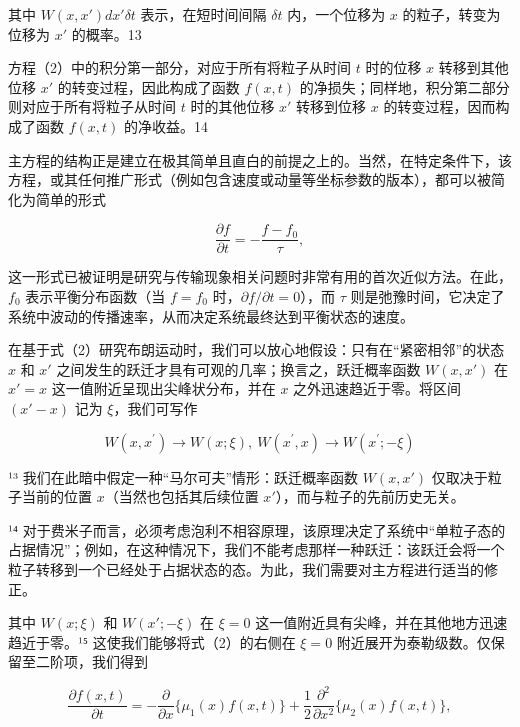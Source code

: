 其中 \(W(x,x')dx'\delta t\) 表示，在短时间间隔 \(\delta t\) 内，一个位移为 \(x\) 的粒子，转变为位移为 \(x'\) 的概率。13

方程（2）中的积分第一部分，对应于所有将粒子从时间 \(t\) 时的位移 \(x\) 转移到其他位移 \(x'\) 的转变过程，因此构成了函数 \(f(x,t)\) 的净损失；同样地，积分第二部分则对应于所有将粒子从时间 \(t\) 时的其他位移 \(x'\) 转移到位移 \(x\) 的转变过程，因而构成了函数 \(f(x,t)\) 的净收益。14

主方程的结构正是建立在极其简单且直白的前提之上的。当然，在特定条件下，该方程，或其任何推广形式（例如包含速度或动量等坐标参数的版本），都可以被简化为简单的形式

\begin{equation}\tag{15.4.3}\label{eq:15.4.3}
\frac { \partial f } { \partial t } = - \frac { f - f _ { 0 } } { \tau } ,
\end{equation}

这一形式已被证明是研究与传输现象相关问题时非常有用的首次近似方法。在此，\(f_0\) 表示平衡分布函数（当 \(f=f_0\) 时，\(\partial f/\partial t=0\)），而 \(\tau\) 则是弛豫时间，它决定了系统中波动的传播速率，从而决定系统最终达到平衡状态的速度。

在基于式（2）研究布朗运动时，我们可以放心地假设：只有在``紧密相邻''的状态 \(x\) 和 \(x'\) 之间发生的跃迁才具有可观的几率；换言之，跃迁概率函数 \(W(x, x')\) 在 \(x' = x\) 这一值附近呈现出尖峰状分布，并在 \(x\) 之外迅速趋近于零。将区间 \((x' - x)\) 记为 \(\xi\)，我们可写作

\begin{equation}\tag{15.4.4}\label{eq:15.4.4}
W ( x , x ^{\prime} ) \rightarrow W ( x ; \xi ) , \ W ( x ^{\prime} , x ) \rightarrow W ( x ^{\prime} ; - \xi )
\end{equation}

¹³ 我们在此暗中假定一种``马尔可夫''情形：跃迁概率函数 \(W(x, x')\) 仅取决于粒子当前的位置 \(x\)（当然也包括其后续位置 \(x'\)），而与粒子的先前历史无关。

¹⁴ 对于费米子而言，必须考虑泡利不相容原理，该原理决定了系统中``单粒子态的占据情况''；例如，在这种情况下，我们不能考虑那样一种跃迁：该跃迁会将一个粒子转移到一个已经处于占据状态的态。为此，我们需要对主方程进行适当的修正。

其中 \(W(x; \xi)\) 和 \(W(x'; -\xi)\) 在 \(\xi=0\) 这一值附近具有尖峰，并在其他地方迅速趋近于零。¹⁵ 这使我们能够将式（2）的右侧在 \(\xi=0\) 附近展开为泰勒级数。仅保留至二阶项，我们得到

\begin{equation}\tag{15.4.5}\label{eq:15.4.5}
\frac { \partial f ( x , t ) } { \partial t } = - \frac { \partial } { \partial x } \{ \mu _ { 1 } ( x ) f ( x , t ) \} + \frac { 1 } { 2 } \frac { \partial ^{2} } { \partial x ^{2} } \{ \mu _ { 2 } ( x ) f ( x , t ) \} ,
\end{equation}

